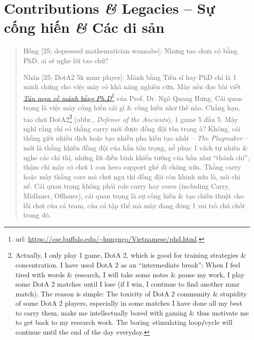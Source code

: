 \documentclass[12pt,twoside]{book}
\begin{document}

\section{Contributions {\it\&} Legacies -- Sự cống hiến {\it\&} Các di sản}

\begin{quote}
	{\sf Hồng [25; depressed mathematician wannabe]}: Nhưng tao chưa có bằng PhD, ai sẽ nghe lời tao chứ?
	
	{\sf Nhân [25; DotA2 5k mmr player]}: Mảnh bằng Tiến sĩ hay PhD chỉ là 1 minh chứng cho việc mày có khả năng nghiên cứu. Mày nên đọc bài viết \href{https://cse.buffalo.edu/~hungngo/Vietnamese/phd.html}{\it Tản mạn về mảnh bằng Ph.D}\footnote{{\sc url}: \url{https://cse.buffalo.edu/~hungngo/Vietnamese/phd.html}.} của Prof. Dr. {\sc Ngô Quang Hưng}. Cái quan trọng là việc mày cống hiến cái gì \& cống hiến như thế nào. Chẳng hạn, tao chơi DotA2\footnote{Actually, I only play 1 game, DotA 2, which is good for training strategies \& concentration. I have used DotA 2 as an ``intermediate break'': When I feel tired with words \& research, I will take some notes \& pause my work, I play some DotA 2 matches until I lose (if I win, I continue to find another {\sc mmr} match). The reason is simple: The toxicity of DotA 2 community \& stupidity of some DotA 2 players, especially in some matches I have done all my best to carry them, make me intellectually bored with gaming \& thus motivate me to get back to my research work. The boring--stimulating loop{\tt/}cycle will continue until the end of the day everyday.} (abbr., {\it Defense of the Ancients}), 1 game 5 đấu 5. Mày nghĩ rằng chỉ có thằng carry mới được đồng đội tôn trọng à? Không, cái thằng giết nhiều địch hoặc tạo nhiều pha kiến tạo nhất -- {\it The Playmaker} -- mới là thằng khiến đồng đội của hắn tôn trọng, nể phục 1 cách tự nhiên \& nghe các chỉ thị, những lời điều binh khiển tướng của hắn như ``thánh chỉ'', thậm chí mày có chơi 1 con hero support ghẻ đi chăng nữa. Thằng carry hoặc mấy thằng core mà chơi ngu thì đồng đội còn khinh nữa là, nói chi nể. Cái quan trọng không phải role carry hay cores (including Carry, Midlaner, Offlaner), cái quan trọng là sự cống hiến \& tạo chiến thuật cho lối chơi của cả team, của cả tập thể mà mày đang đóng 1 vai trò chủ chốt trong đó.
\end{quote}
\end{document}
